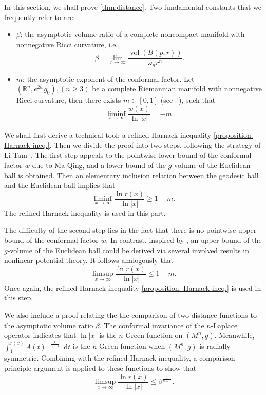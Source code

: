 \documentclass[10pt,a4paper]{amsart}
\numberwithin{equation}{section}
\newcommand{\dd}{\mathop{}\!\mathrm{d}}%
\begin{document}
In this section, we shall prove \cref{thm:distance}.  Two fundamental constants that we frequently refer to are: 
\begin{itemize}
    \item $\beta$: the asymptotic volume ratio of a complete noncompact manifold with nonnegative Ricci curvature, i.e., 
    \begin{equation*}
        \beta=\lim_{r\to \infty}\frac{\operatorname{vol}(B(p,r))}{\omega_nr^n}.
    \end{equation*}
    \item $m$: the asymptotic exponent of the conformal factor. Let $(\mathbb{R}^n, e^{2w}g_0),(n\geq 3)$ be a complete Riemannian manifold with nonnegative Ricci curvature, then there exists $m\in [0,1]$ (see ~\cite[Theorem 1.3]{MQ}), such that
    \begin{equation}\label{def of m}
        \liminf_{x\to \infty} 
    \frac{ w(x)}{\ln |x|}=-m.
    \end{equation}  
\end{itemize}

We shall first derive a technical tool: a refined Harnack inequality \cref{proposition. Harnack ineq.}. Then we divide the proof into two steps, following the strategy of Li-Tam~\cite{LT2}. The first step appeals to the pointwise lower bound of the conformal factor $w$ due to Ma-Qing, and a lower bound of the $g$-volume of the Euclidean ball is obtained. Then an elementary inclusion relation between the geodesic ball and the Euclidean ball implies that
    \[
        \liminf_{x\to \infty}\frac{\ln r(x)}{\ln |x|}\geq 1-m.
    \]
The refined Harnack inequality is used in this part.

The difficulty of the second step lies in the fact that there is no pointwise upper bound of the conformal factor $w$. In contrast, inspired by \cite[Theorem 3.1, Proposition 4.1]{MQ}, an upper bound of the $g$-volume of the Euclidean ball could be derived via several involved results in nonlinear potential theory. It follows analogously that
    \[
        \limsup_{x\to \infty}\frac{\ln r(x)}{\ln |x|}\leq 1-m.
    \]
Once again, the refined Harnack inequality \cref{proposition. Harnack ineq.} is used in this step.

We also include a proof relating the the comparison of two distance functions to the asymptotic volume ratio $\beta$. The conformal invariance of the $n$-Laplace operator indicates that $\ln |x|$ is the $n$-Green function on $(M^n,g)$. Meanwhile, $\int_1^{r(x)}A(t)^{-\frac{1}{n-1}}\dd t$ is the $n$-Green function when $(M^n,g)$ is radially symmetric. Combining with the refined  Harnack inequality, a comparison principle argument is applied to these functions to show that 
    \[
        \limsup_{x\to\infty}\frac{\ln r(x)}{\ln |x|}\leq \beta^{\frac{1}{n-1}}.
    \]
\end{document}
